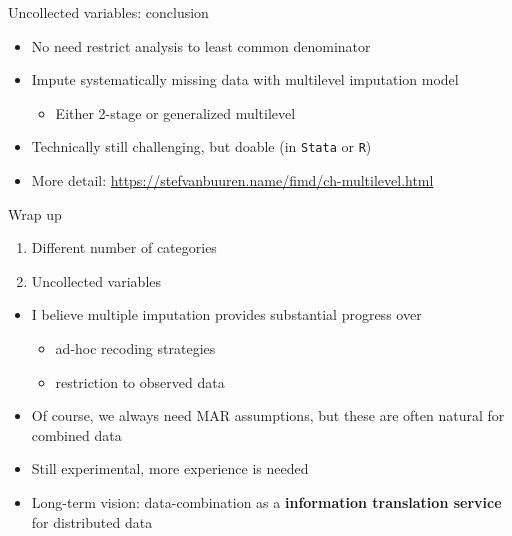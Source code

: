 \documentclass[ignorenonframetext,aspectratio=43]{beamer}
\providecommand{\tightlist}{%
  \setlength{\itemsep}{0pt}\setlength{\parskip}{0pt}}
\begin{document}
\begin{frame}[fragile]{Uncollected variables: conclusion}
\protect\hypertarget{uncollected-variables-conclusion}{}

\begin{itemize}
\tightlist
\item
  No need restrict analysis to least common denominator
\item
  Impute systematically missing data with multilevel imputation model

  \begin{itemize}
  \tightlist
  \item
    Either 2-stage or generalized multilevel
  \end{itemize}
\item
  Technically still challenging, but doable (in \texttt{Stata} or
  \texttt{R})
\item
  More detail: \url{https://stefvanbuuren.name/fimd/ch-multilevel.html}
\end{itemize}

\end{frame}

\begin{frame}{Wrap up}
\protect\hypertarget{wrap-up}{}

\begin{enumerate}
\tightlist
\item
  Different number of categories
\item
  Uncollected variables
\end{enumerate}

\begin{itemize}
\tightlist
\item
  I believe multiple imputation provides substantial progress over

  \begin{itemize}
  \tightlist
  \item
    ad-hoc recoding strategies
  \item
    restriction to observed data
  \end{itemize}
\item
  Of course, we always need MAR assumptions, but these are often natural
  for combined data
\item
  Still experimental, more experience is needed
\item
  Long-term vision: data-combination as a \textbf{information
  translation service} for distributed data
\end{itemize}

\end{frame}
\end{document}
